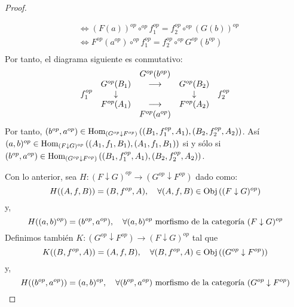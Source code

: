 \documentclass[12pt]{report}
\theoremstyle{largebreak}
\newcommand\cf[3]{\ensuremath{#1:#2\rightarrow#3}}
\newcommand{\Obj}[1]{\ensuremath{\textup{Obj}\left(#1\right)}}
\newcommand{\Hom}[3]{\ensuremath{\textup{Hom}_{#1}\left(#2,#3\right)}}
\begin{document}
\begin{proof}
\begin{enumerate}
\begin{equation*}
\begin{split}
                    &\iff (F(a))^{op}\circ^{op}f_1^{op}=f_2^{op}\circ^{op}(G(b))^{op}\\
                    &\iff F^{op}(a^{op})\circ^{op}f_1^{op}=f_2^{op}\circ^{op}G^{op}(b^{op})\\
                \end{split}
            \end{equation*}
            Por tanto, el diagrama siguiente es conmutativo:
            \begin{equation*}
                \begin{array}[pos]{lcccr}
                    & & G^{op}(b^{op}) & & \\
                    & G^{op}(B_1) & \longrightarrow & G^{op}(B_2) & \\
                    f_1^{op} & \downarrow & & \downarrow & f_2^{op}\\
                    & F^{op}(A_1) & \longrightarrow & F^{op}(A_2) & \\
                    & & F^{op}(a^{op}) & & \\
                \end{array}
            \end{equation*}
            Por tanto, $(b^{op},a^{op})\in\Hom{(G^{op}\downarrow F^{op})}{(B_1,f_1^{op},A_1)}{(B_2,f_2^{op},A_2)}$. Así
            $(a,b)^{op}\in\Hom{(F\downarrow G)^{op}}{(A_1,f_1,B_1)}{(A_1,f_1,B_1)}$ si y sólo si $(b^{op},a^{op})\in\Hom{(G^{op}\downarrow F^{op})}{(B_1,f_1^{op},A_1)}{(B_2,f_2^{op},A_2)}$.
        \end{enumerate}
        Con lo anterior, sea $\cf{H}{(F\downarrow G)^{op}}{(G^{op}\downarrow F^{op})}$ dado como:
        \begin{equation*}
            H((A,f,B))=(B,f^{op},A),\quad\forall (A,f,B)\in\Obj{(F\downarrow G)^{op}}
        \end{equation*}
        y,
        \begin{equation*}
            H((a,b)^{op})=(b^{op},a^{op}),\quad\forall (a,b)^{op}\textup{ morfismo de la categoría }(F\downarrow G)^{op}
        \end{equation*}
        Definimos también $\cf{K}{(G^{op}\downarrow F^{op})}{(F\downarrow G)^{op}}$ tal que
        \begin{equation*}
            K((B,f^{op},A))=(A,f,B),\quad\forall (B,f^{op},A)\in\Obj{(G^{op}\downarrow F^{op})}
        \end{equation*}
        y,
        \begin{equation*}
            H((b^{op},a^{op}))=(a,b)^{op},\quad\forall (b^{op},a^{op})\textup{ morfismo de la categoría }(G^{op}\downarrow F^{op})

\end{equation*}
\end{proof}
\end{document}
